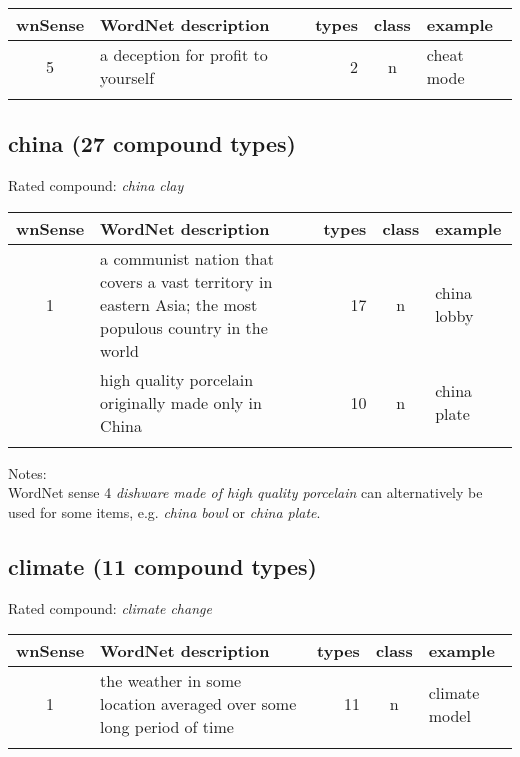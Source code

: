 \noindent
\begin{longtable}{c>{\raggedright\arraybackslash}p{5cm}rc>{\raggedright\arraybackslash}p{2cm}}\lsptoprule
{\small wnSense}&WordNet description&types&class&example\\\midrule
5&a deception for profit to yourself&2&n&cheat mode\\\lspbottomrule
\end{longtable}
\pagebreak[3]
\subsection{china        (27 compound types)}
Rated compound: \emph{china clay}

\vspace*{1ex}

\noindent
\begin{longtable}{c>{\raggedright\arraybackslash}p{5cm}rc>{\raggedright\arraybackslash}p{2cm}}\lsptoprule
{\small wnSense}&WordNet description&types&class&example\\\midrule
1&a communist nation that covers a vast territory in eastern Asia; the most populous country in the world&17&n&china lobby\\\tablevspace
2&high quality porcelain originally made only in China&10&n&china plate\\\lspbottomrule
\end{longtable}

\noindent
Notes:\\ WordNet sense 4 \emph{dishware made of high quality porcelain}
can alternatively be used for some items, e.g. \emph{china bowl} or
\emph{china plate}.


\subsection{climate      (11 compound types)}
Rated compound: \emph{climate change}

\vspace*{1ex}

\noindent
\begin{longtable}{c>{\raggedright\arraybackslash}p{5cm}rc>{\raggedright\arraybackslash}p{2cm}}\lsptoprule
{\small wnSense}&WordNet description&types&class&example\\\midrule
1&the weather in some location averaged over some long period of time&11&n&climate model\\\lspbottomrule
\end{longtable}

